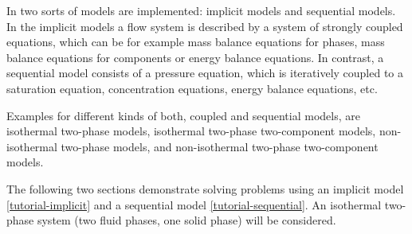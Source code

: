 In \Dumux two sorts of models are implemented: implicit models and
sequential models. In the implicit models a flow system is described by a
system of strongly coupled equations, which can be for example mass balance
equations for phases, mass balance equations for components or energy balance
equations. In contrast, a sequential model consists of a pressure equation, which
is iteratively coupled to a saturation equation, concentration equations, energy
balance equations, etc.

Examples for different kinds of both, coupled and sequential models, are
isothermal two-phase models, isothermal two-phase two-component models,
non-isothermal two-phase models, and non-isothermal two-phase two-component
models.

The following two sections demonstrate solving problems using an implicit
model \ref{tutorial-implicit} and a sequential model \ref{tutorial-sequential}.
An isothermal two-phase system (two fluid phases, one solid phase) will be
considered.
